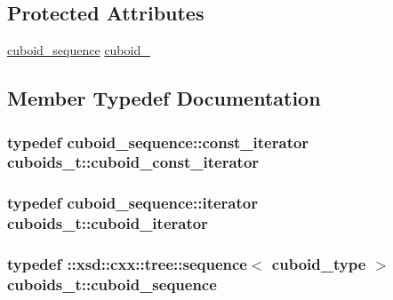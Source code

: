 \subsection*{Protected Attributes}
\begin{DoxyCompactItemize}
\item 
\hyperlink{classcuboids__t_ae3d3abd50bb0570dfe0d4d2d97485261}{cuboid\-\_\-sequence} \hyperlink{classcuboids__t_a82604cb9beb9bfd3620947e4729e167e}{cuboid\-\_\-}
\end{DoxyCompactItemize}


\subsection{Member Typedef Documentation}
\hypertarget{classcuboids__t_a4c6feaefcda62b64615c74892b835b04}{
\subsubsection[{cuboid\-\_\-const\-\_\-iterator}]{\setlength{\rightskip}{0pt plus 5cm}typedef cuboid\-\_\-sequence\-::const\-\_\-iterator {\bf cuboids\-\_\-t\-::cuboid\-\_\-const\-\_\-iterator}}}\label{classcuboids__t_a4c6feaefcda62b64615c74892b835b04}
\hypertarget{classcuboids__t_a63fead1ce5b1d5d61e641a72d80349e9}{
\subsubsection[{cuboid\-\_\-iterator}]{\setlength{\rightskip}{0pt plus 5cm}typedef cuboid\-\_\-sequence\-::iterator {\bf cuboids\-\_\-t\-::cuboid\-\_\-iterator}}}\label{classcuboids__t_a63fead1ce5b1d5d61e641a72d80349e9}
\hypertarget{classcuboids__t_ae3d3abd50bb0570dfe0d4d2d97485261}{
\subsubsection[{cuboid\-\_\-sequence}]{\setlength{\rightskip}{0pt plus 5cm}typedef \-::xsd\-::cxx\-::tree\-::sequence$<$ {\bf cuboid\-\_\-type} $>$ {\bf cuboids\-\_\-t\-::cuboid\-\_\-sequence}}}\label{classcuboids__t_ae3d3abd50bb0570dfe0d4d2d97485261}
